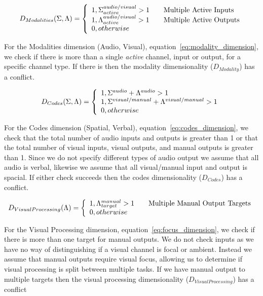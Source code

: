 \begin{equation}
D_{Modalities}(\Sigma, \Lambda) = \left\{ 
  \begin{array}{l l}
    1, \Sigma_{active}^{audio/visual} > 1 & \quad \text{Multiple Active Inputs}\\
    1, \Lambda_{active}^{audio/visual} > 1 & \quad \text{Multiple Active Outputs}\\
    0, otherwise
  \end{array}
  \right.
  \label{eq:modality_dimension}
\end{equation}

For the Modalities dimension (Audio, Visual), equation~\ref{eq:modality_dimension}, we check if there is more than a single {\em active} channel, input or output, for a specific channel type.  If there is then the modality dimensionality ($D_{Modality}$) has a conflict.

\begin{equation}
D_{Codes}(\Sigma, \Lambda) = \left\{ 
  \begin{array}{l l}
    1, \Sigma^{audio} + \Lambda^{audio} > 1\\
    1, \Sigma^{visual/manual} + \Lambda^{visual/manual} > 1\\
    0, otherwise
  \end{array}
  \right.
  \label{eq:codes_dimension}
\end{equation}

For the Codes dimension (Spatial, Verbal), equation~\ref{eq:codes_dimension}, we check that the total number of audio inputs and outputs is greater than 1 or that the total number of visual inputs, visual outputs, and manual outputs is greater than 1.  Since we do not specify different types of audio output we assume that all audio is verbal, likewise we assume that all visual/manual input and output is spacial.  If either check succeeds then the codes dimensionality ($D_{Codes}$) has a conflict.

\begin{equation}
D_{Visual Processing}(\Lambda) = \left\{ 
  \begin{array}{l l}
    1, \Lambda_{target}^{manual} > 1 & \quad \text{Multiple Manual Output Targets}\\
    0, otherwise
  \end{array}
  \right.
  \label{eq:focus_dimension}
\end{equation}

For the Visual Processing dimension, equation~\ref{eq:focus_dimension}, we check if there is more than one target for manual outputs.  We do not check inputs as we have no way of distinguishing if a visual channel is focal or ambient.  Instead we assume that manual outputs require visual focus, allowing us to determine if visual processing is split between multiple tasks.  If we have manual output to multiple targets then the visual processing dimensionality ($D_{Visual Processing}$) has a conflict

